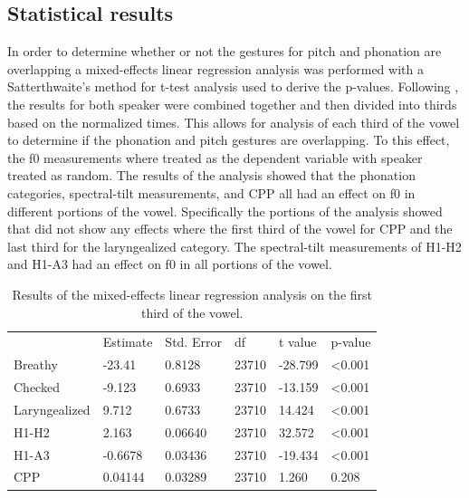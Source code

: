 \documentclass[12pt, letterpaper]{article}
\providecommand{\lsptoprule}{\midrule\toprule}
\providecommand{\lspbottomrule}{\bottomrule\midrule}
\begin{document}
\subsection{Statistical results} \label{sec:Stats}
In order to determine whether or not the gestures for pitch and phonation are overlapping a mixed-effects linear regression analysis was performed with a Satterthwaite's method for t-test analysis used to derive the p-values. Following \citet{garellekAcousticConsequencesPhonation2011}, the results for both speaker were combined together and then divided into thirds based on the normalized times. This allows for analysis of each third of the vowel to determine if the phonation and pitch gestures are overlapping. To this effect, the f0 measurements where treated as the dependent variable with speaker treated as random. The results of the analysis showed that the phonation categories, spectral-tilt measurements, and CPP all had an effect on f0 in different portions of the vowel. Specifically the portions of the analysis showed that did not show any effects where the first third of the vowel for CPP and the last third for the laryngealized category. The spectral-tilt measurements of H1-H2 and H1-A3 had an effect on f0 in all portions of the vowel. 

\begin{table}[!h]
	\centering
	\caption{Results of the mixed-effects linear regression analysis on the first third of the vowel. }
	\label{tab:First}
	 \begin{tabular}{llllll}
	  \lsptoprule
						&  Estimate  & Std. Error & df & t value & p-value \\
	  	Breathy   		&  -23.41  	&  0.8128	& 23710 & -28.799 	& <0.001\\
		Checked    		&  -9.123  	&  0.6933	& 23710 & -13.159 	& <0.001 \\
		Laryngealized	& 9.712		& 0.6733	& 23710	& 14.424 	& <0.001 \\
		H1-H2			& 2.163		& 0.06640	& 23710	& 32.572 	& <0.001\\
		H1-A3			& -0.6678 	& 0.03436	& 23710	& -19.434	& <0.001\\
		CPP				& 0.04144	& 0.03289	& 23710	& 1.260		& 0.208\\
	  \lspbottomrule
	 \end{tabular}
\end{table}
\end{document}
